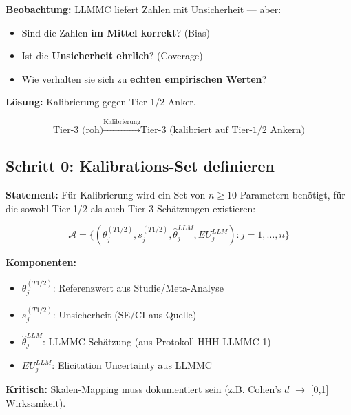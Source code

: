 \begin{tcolorbox}[colback=red!5!white, colframe=red!75!black,
    title=\textbf{Das Problem: Unkalibrierte LLM-Schätzungen}]

\textbf{Beobachtung:} LLMMC liefert Zahlen mit Unsicherheit --- aber:
\begin{itemize}[nosep]
    \item Sind die Zahlen \textbf{im Mittel korrekt}? (Bias)
    \item Ist die \textbf{Unsicherheit ehrlich}? (Coverage)
    \item Wie verhalten sie sich zu \textbf{echten empirischen Werten}?
\end{itemize}

\textbf{Lösung:} Kalibrierung gegen Tier-1/2 Anker.

\begin{equation*}
\boxed{\text{Tier-3 (roh)} \xrightarrow{\text{Kalibrierung}} \text{Tier-3 (kalibriert auf Tier-1/2 Ankern)}}
\end{equation*}

\end{tcolorbox}

\subsection{Schritt 0: Kalibrations-Set definieren}

\begin{tcolorbox}[colback=gray!5!white, colframe=gray!75!black,
    title=\textbf{Axiom UNMAPPED_CAL-1: Kalibrations-Anker-Anforderung}]

\textbf{Statement:} Für Kalibrierung wird ein Set von $n \geq 10$ Parametern benötigt, für die sowohl Tier-1/2 als auch Tier-3 Schätzungen existieren:

\begin{equation}
\mathcal{A} = \{(\theta_j^{(T1/2)}, s_j^{(T1/2)}, \hat{\theta}_j^{LLM}, EU_j^{LLM}) : j = 1, \ldots, n\}
\end{equation}

\textbf{Komponenten:}
\begin{itemize}[nosep]
    \item $\theta_j^{(T1/2)}$: Referenzwert aus Studie/Meta-Analyse
    \item $s_j^{(T1/2)}$: Unsicherheit (SE/CI aus Quelle)
    \item $\hat{\theta}_j^{LLM}$: LLMMC-Schätzung (aus Protokoll HHH-LLMMC-1)
    \item $EU_j^{LLM}$: Elicitation Uncertainty aus LLMMC
\end{itemize}

\textbf{Kritisch:} Skalen-Mapping muss dokumentiert sein (z.B. Cohen's $d$ $\rightarrow$ [0,1] Wirksamkeit).

\end{tcolorbox}

